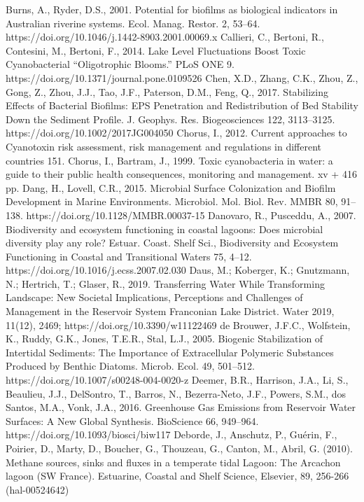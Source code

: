 \begin{thebibliography}{}
Burns, A., Ryder, D.S., 2001. Potential for biofilms as biological indicators in Australian riverine systems. Ecol. Manag. Restor. 2, 53–64. https://doi.org/10.1046/j.1442-8903.2001.00069.x
Callieri, C., Bertoni, R., Contesini, M., Bertoni, F., 2014. Lake Level Fluctuations Boost Toxic Cyanobacterial “Oligotrophic Blooms.” PLoS ONE 9. https://doi.org/10.1371/journal.pone.0109526
Chen, X.D., Zhang, C.K., Zhou, Z., Gong, Z., Zhou, J.J., Tao, J.F., Paterson, D.M., Feng, Q., 2017. Stabilizing Effects of Bacterial Biofilms: EPS Penetration and Redistribution of Bed Stability Down the Sediment Profile. J. Geophys. Res. Biogeosciences 122, 3113–3125. https://doi.org/10.1002/2017JG004050
Chorus, I., 2012. Current approaches to Cyanotoxin risk assessment, risk management and regulations in different countries 151.
Chorus, I., Bartram, J., 1999. Toxic cyanobacteria in water: a guide to their public health consequences, monitoring and management. xv + 416 pp.
Dang, H., Lovell, C.R., 2015. Microbial Surface Colonization and Biofilm Development in Marine Environments. Microbiol. Mol. Biol. Rev. MMBR 80, 91–138. https://doi.org/10.1128/MMBR.00037-15
Danovaro, R., Pusceddu, A., 2007. Biodiversity and ecosystem functioning in coastal lagoons: Does microbial diversity play any role? Estuar. Coast. Shelf Sci., Biodiversity and Ecosystem Functioning in Coastal and Transitional Waters 75, 4–12. https://doi.org/10.1016/j.ecss.2007.02.030
Daus, M.; Koberger, K.; Gnutzmann, N.; Hertrich, T.; Glaser, R., 2019. Transferring Water While Transforming Landscape: New Societal Implications, Perceptions and Challenges of Management in the Reservoir System Franconian Lake District. Water 2019, 11(12), 2469; https://doi.org/10.3390/w11122469
de Brouwer, J.F.C., Wolfstein, K., Ruddy, G.K., Jones, T.E.R., Stal, L.J., 2005. Biogenic Stabilization of Intertidal Sediments: The Importance of Extracellular Polymeric Substances Produced by Benthic Diatoms. Microb. Ecol. 49, 501–512. https://doi.org/10.1007/s00248-004-0020-z
Deemer, B.R., Harrison, J.A., Li, S., Beaulieu, J.J., DelSontro, T., Barros, N., Bezerra-Neto, J.F., Powers, S.M., dos Santos, M.A., Vonk, J.A., 2016. Greenhouse Gas Emissions from Reservoir Water Surfaces: A New Global Synthesis. BioScience 66, 949–964. https://doi.org/10.1093/biosci/biw117
Deborde, J., Anschutz, P., Guérin, F., Poirier, D., Marty, D., Boucher, G., Thouzeau, G., Canton, M., Abril, G. (2010). Methane sources, sinks and fluxes in a temperate tidal Lagoon: The Arcachon lagoon (SW France). Estuarine, Coastal and Shelf Science, Elsevier, 89, 256-266 (hal-00524642)

\end{thebibliography}
